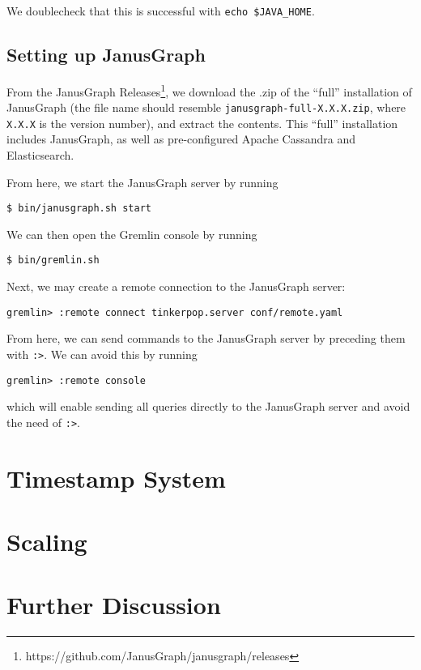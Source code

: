 \documentclass[12pt]{article}
\newcommand{\code}[1]{\colorbox{backcolour}{\texttt{#1}}}
\begin{document}
We doublecheck that this is successful with \code{echo \$JAVA\_HOME}.

\subsection{Setting up JanusGraph}

From the JanusGraph Releases\footnote{https://github.com/JanusGraph/janusgraph/releases}, we download the .zip of the ``full'' installation of JanusGraph (the file name should resemble \code{janusgraph-full-X.X.X.zip}, where \code{X.X.X} is the version number), and extract the contents. This ``full'' installation includes JanusGraph, as well as pre-configured Apache Cassandra and Elasticsearch.

From here, we start the JanusGraph server by running
\begin{lstlisting}[numbers=none]
$ bin/janusgraph.sh start
\end{lstlisting}

We can then open the Gremlin console by running
\begin{lstlisting}[numbers=none]
$ bin/gremlin.sh
\end{lstlisting}

Next, we may create a remote connection to the JanusGraph server:
\begin{lstlisting}[numbers=none]
gremlin> :remote connect tinkerpop.server conf/remote.yaml
\end{lstlisting}

From here, we can send commands to the JanusGraph server by preceding them with \code{:>}. We can avoid this by running 
\begin{lstlisting}[numbers=none]
gremlin> :remote console
\end{lstlisting}
which will enable sending all queries directly to the JanusGraph server and avoid the need of \code{:>}.



\section{Timestamp System}

\section{Scaling}

\section{Further Discussion}
\end{document}
